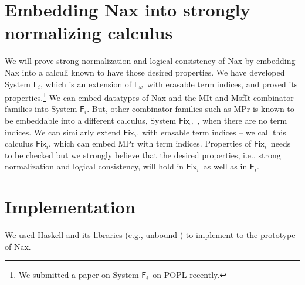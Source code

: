 \documentclass{llncs}
\newcommand{\ie}{{i.e.}}
\newcommand{\eg}{{e.g.}}
\newcommand{\Fi}{\ensuremath{\mathsf{F}_i}}
\newcommand{\Fw}{\ensuremath{\mathsf{F}_\omega}}
\newcommand{\Fix}{\mathsf{Fix}}
\newcommand{\Fixw}{\ensuremath{\Fix_{\omega}}}
\newcommand{\Fixi}{\ensuremath{\Fix_{i}}}
\begin{document}
\section{Embedding Nax into strongly normalizing calculus}
We will prove strong normalization and logical consistency of Nax
by embedding Nax into a calculi known to have those desired properties.
We have developed System \Fi, which is an extension of \Fw\ with 
erasable term indices, and proved its properties.\footnote{
	We submitted a paper on System \Fi\ on POPL recently.}
We can embed datatypes of Nax and the \textsf{MIt} and \textsf{MsfIt}
combinator families into System \Fi. But, other combinator families
such as \textsf{MPr} is known to be embeddable into a different
calculus, System \Fixw\ \cite{AbeMat04}, when there are no term indices.
We can similarly extend \Fixw\ with erasable term indices -- we call this
calculus \Fixi, which can embed \textsf{MPr} with term indices.
Properties of \Fixi\ needs to be checked but we strongly believe
that the desired properties, \ie, strong normalization
and logical consistency, will hold in \Fixi\ as well as in \Fi.

\section{Implementation}
We used Haskell and its libraries (\eg, unbound \cite{unbound})
to implement to the prototype of Nax.





\end{document}
